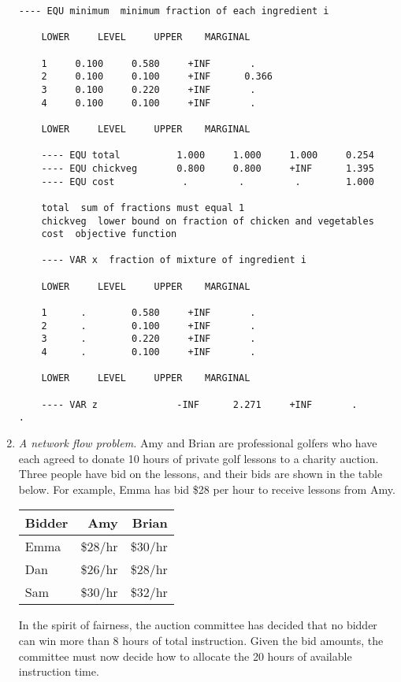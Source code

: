 \begin{enumerate}
\begin{solution}
\begin{Verbatim}[samepage=true]
	---- EQU minimum  minimum fraction of each ingredient i
	
	LOWER     LEVEL     UPPER    MARGINAL
	
	1     0.100     0.580     +INF       .         
	2     0.100     0.100     +INF      0.366      
	3     0.100     0.220     +INF       .         
	4     0.100     0.100     +INF       .         
	
	LOWER     LEVEL     UPPER    MARGINAL
	
	---- EQU total          1.000     1.000     1.000     0.254      
	---- EQU chickveg       0.800     0.800     +INF      1.395      
	---- EQU cost            .         .         .        1.000      
	
	total  sum of fractions must equal 1
	chickveg  lower bound on fraction of chicken and vegetables
	cost  objective function
	
	---- VAR x  fraction of mixture of ingredient i
	
	LOWER     LEVEL     UPPER    MARGINAL
	
	1      .        0.580     +INF       .         
	2      .        0.100     +INF       .         
	3      .        0.220     +INF       .         
	4      .        0.100     +INF       .         
	
	LOWER     LEVEL     UPPER    MARGINAL
	
	---- VAR z              -INF      2.271     +INF       .          .         
	\end{Verbatim}
	
\end{solution}


\item \emph{A network flow problem.}  Amy and Brian are professional
  golfers who have each agreed to donate 10 hours of private golf
  lessons to a charity auction. Three people have bid on the lessons,
  and their bids are shown in the table below. For example, Emma has
  bid \$28 per hour to receive lessons from Amy.

\begin{tabular}{lrr}
Bidder & Amy & Brian \\ \hline
Emma & \$28/hr & \$30/hr \\
Dan     & \$26/hr & \$28/hr \\
Sam  & \$30/hr & \$32/hr
\end{tabular}

In the spirit of fairness, the auction committee has decided that no bidder can win 
more than 8 hours of total instruction. Given the bid amounts, the committee must now
decide how to allocate the 20 hours of available instruction time.


\end{enumerate}
